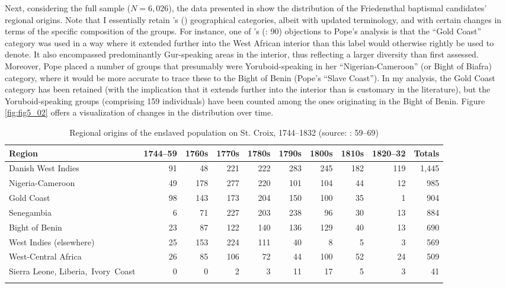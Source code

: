 \documentclass[output=paper,colorlinks,citecolor=brown]{langscibook}
\begin{document}
Next, considering the full sample ($N=6{,}026$), the data presented in  show the distribution of the Friedensthal baptismal candidates' regional origins. Note that I essentially retain \citeauthor{Pope_1970}’s (\citeyear{Pope_1970}) geographical categories, albeit with updated terminology, and with certain changes in terms of the specific composition of the groups. For instance, one of \citeauthor{Sebro_2010}’s (\citeyear{Sebro_2010}: 90) objections to Pope's analysis is that the ``Gold Coast'' category was used in a way where it extended further into the West African interior than this label would otherwise rightly be used to denote. It also encompassed predominantly Gur-speaking areas in the interior, thus reflecting a larger diversity than first assessed. Moreover, Pope placed a number of groups that presumably were Yoruboid-speaking in her ``Nigerian-Cameroon'' (or Bight of Biafra) category, where it would be more accurate to trace these to the Bight of Benin (Pope's ``Slave Coast''). In my analysis, the Gold Coast category has been retained (with the implication that it extends further into the interior than is customary in the literature), but the Yoruboid-speaking groups (comprising 159 individuals) have been counted among the ones originating in the Bight of Benin. Figure \ref{fig:fig5_02} offers a visualization of changes in the distribution over time.

\begin{table}
\small
\begin{tabularx}{\textwidth}{Q*{9}{r}@{}}  %
    \lsptoprule %
    Region & 1744–59 & 1760s & 1770s & 1780s & 1790s & 1800s & 1810s & 1820–32 & Totals \\
    \midrule
    Danish West Indies & 91 & 48 & 221 & 222 & 283 & 245 & 182 & 119 & 1,445 \\
    \tablevspace
    Nigeria-Cameroon & 49 & 178 & 277 & 220 & 101 & 104 & 44 & 12 & 985 \\
    \tablevspace
    Gold Coast & 98 & 143 & 173 & 204 & 150 & 100 & 35 & 1 & 904 \\
    \tablevspace
    Senegambia & 6 & 71 & 227 & 203 & 238 & 96 & 30 & 13 & 884 \\
    \tablevspace
    Bight of Benin & 23 & 87 & 122 & 140 & 136 & 129 & 40 & 13 & 690 \\
    \tablevspace
    West Indies (elsewhere) & 25 & 153 & 224 & 111 & 40 & 8 & 5 & 3 & 569 \\
    \tablevspace
    \mbox{West-Central} Africa & 26 & 85 & 106 & 72 & 44 & 100 & 52 & 24 & 509 \\
    \tablevspace
    Sierra Leone, \mbox{Liberia, Ivory Coast} & 0 & 0 & 2 & 3 & 11 & 17 & 5 & 3 & 41 \\ \lspbottomrule %
\end{tabularx}
\caption{Regional origins of the enslaved population on St. Croix, 1744–1832 (source: \cite{Pope_1970}: 59–69)}
\label{tab:tab9_02}
\end{table}
\end{document}

